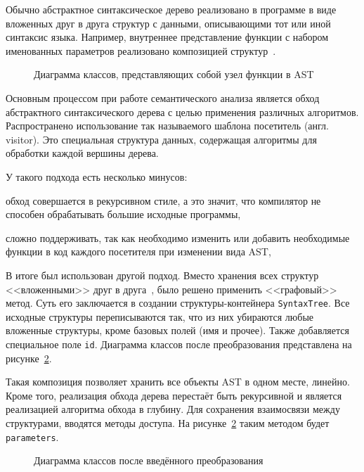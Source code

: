 Обычно абстрактное синтаксическое дерево реализовано в программе в виде вложенных друг в друга структур с данными, описывающими тот или иной синтаксис языка.
Например, внутреннее представление функции с набором именованных параметров реализовано композицией структур~.

\begin{figure}[H]
    \centering
    
    \caption{Диаграмма классов, представляющих собой узел функции в AST}
    \label{fig:func_AST}
\end{figure}

Основным процессом при работе семантического анализа является обход абстрактного синтаксического дерева с целью применения различных алгоритмов.
Распространено использование так называемого шаблона посетитель (англ. visitor).
Это специальная структура данных, содержащая алгоритмы для обработки каждой вершины дерева.

У такого подхода есть несколько минусов:
\begin{inparaenum}[1)]
    \item обход совершается в рекурсивном стиле, а это значит, что компилятор не способен обрабатывать большие исходные программы,
    \item сложно поддерживать, так как необходимо изменить или добавить необходимые функции в код каждого посетителя при изменении вида AST,
\end{inparaenum}

В итоге был использован другой подход.
Вместо хранения всех структур <<вложенными>> друг в друга~, было решено применить <<графовый>> метод.
Суть его заключается в создании структуры-контейнера \lstinline{SyntaxTree}.
Все исходные структуры переписываются так, что из них убираются любые вложенные структуры, кроме базовых полей (имя и прочее).
Также добавляется специальное поле \lstinline{id}.
Диаграмма классов после преобразования представлена на рисунке~\ref{fig:func_AST_after}.

Такая композиция позволяет хранить все объекты AST в одном месте, линейно.
Кроме того, реализация обхода дерева перестаёт быть рекурсивной и является реализацией алгоритма обхода в глубину.
Для сохранения взаимосвязи между структурами, вводятся методы доступа.
На рисунке~\ref{fig:func_AST_after} таким методом будет \lstinline{parameters}.

\begin{figure}[H]
    \centering
    
    \caption{Диаграмма классов после введённого преобразования}
    \label{fig:func_AST_after}
\end{figure}

